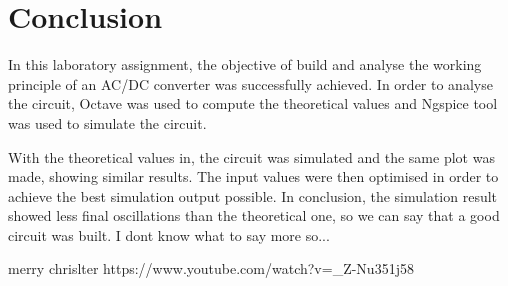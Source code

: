 \section{Conclusion}
\label{sec:conclusion}

In this laboratory assignment, the objective of build and analyse the working principle of an AC/DC converter was successfully achieved.
In order to analyse the circuit, Octave was used to compute the theoretical values and Ngspice tool
was used to simulate the circuit.

With the theoretical values in, the circuit was simulated and the same plot was made, showing
similar results. The input values were then optimised in order to achieve the best simulation output
possible. In conclusion, the simulation result showed less final oscillations than the theoretical one, so we can say that a good circuit was built. I dont know what to say more so...

merry chrislter
https://www.youtube.com/watch?v=_Z-Nu351j58

